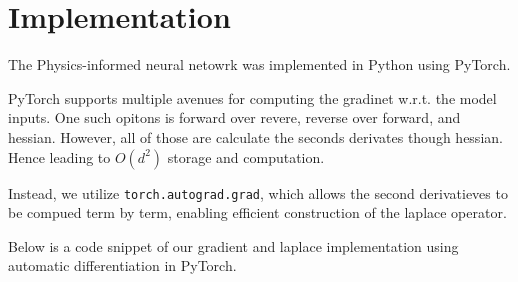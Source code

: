 % 
% 
% 
% 
% 
% 
% 
% 
% 
% 
% 
% 



\section{Implementation}

The Physics-informed neural netowrk was implemented in Python using PyTorch.

PyTorch supports multiple avenues for computing the gradinet w.r.t. the model inputs.
One such opitons is forward over revere, reverse over forward, and hessian.
However, all of those are calculate the seconds derivates though hessian.
Hence leading to $O(d^2)$ storage and computation.


Instead, we utilize \texttt{torch.autograd.grad},
which allows the second derivatieves to be compued term by term,
enabling efficient construction of the laplace operator.

Below is a code snippet of our gradient and laplace implementation using automatic differentiation in PyTorch.

